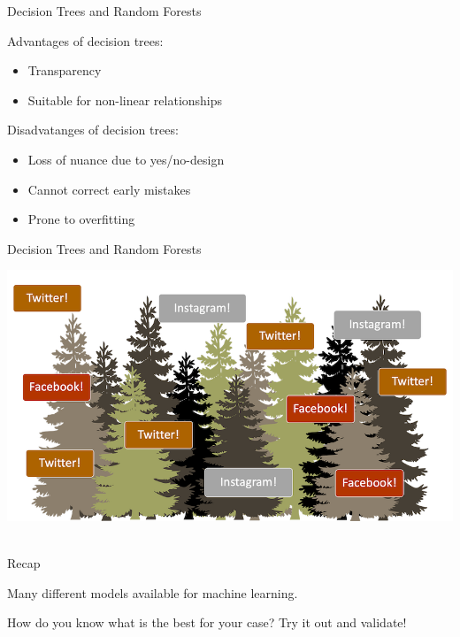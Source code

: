 \documentclass[compress]{beamer}
\begin{document}
\begin{frame}[fragile]{Decision Trees and Random Forests} 
	
	\begin{alertblock}{Advantages of decision trees:}
		\begin{itemize}
			\item Transparency
			\item  Suitable for non-linear relationships
		\end{itemize}
	\end{alertblock}
	
	\begin{alertblock}{Disadvatanges of decision trees:}
		\begin{itemize}
			\item Loss of nuance due to yes/no-design
			\item Cannot correct early mistakes
			\item Prone to overfitting
		\end{itemize}
	\end{alertblock}	
	
\end{frame}


\begin{frame}{Decision Trees and Random Forests}
	
\begin{center}
	\includegraphics[width=\linewidth,height=\textheight,keepaspectratio]{../pictures/randomforest.png} \\\
\end{center}
\end{frame}


\begin{frame}{Recap}
	
Many different models available for machine learning.
	
How do you know what is the best for your case? Try it out and validate!
	
\end{frame}
\end{document}
